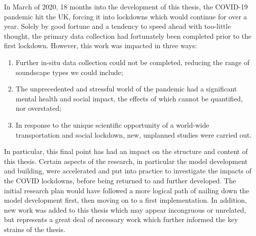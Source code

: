 \documentclass[oneside,fontsize=13pt,titlepage]{scrbook}
\begin{document}
In March of 2020, 18 months into the development of this thesis, the COVID-19 pandemic hit the UK, forcing it into lockdowns which would continue for over a year. Solely by good fortune and a tendency to speed ahead with too-little thought, the primary data collection had fortunately been completed prior to the first lockdown. However, this work was impacted in three ways:

\begin{enumerate}
      \item Further in-situ data collection could not be completed, reducing the range of soundscape types we could include;
      \item The unprecedented and stressful world of the pandemic had a significant mental health and social impact, the effects of which cannot be quantified, nor overstated;
      \item In response to the unique scientific opportunity of a world-wide transportation and social lockdown, new, unplanned studies were carried out.
\end{enumerate}

In particular, this final point has had an impact on the structure and content of this thesis. Certain aspects of the research, in particular the model development and building, were accelerated and put into practice to investigate the impacts of the COVID lockdowns, before being returned to and further developed. The initial research plan would have followed a more logical path of nailing down the model development first, then moving on to a first implementation. In addition, new work was added to this thesis which may appear incongruous or unrelated, but represents a great deal of necessary work which further informed the key strains of the thesis.




\tableofcontents


\mainmatter




\end{document}
